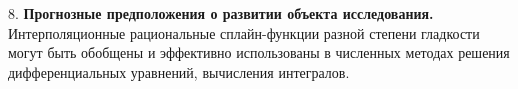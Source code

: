 8. \textbf{ Прогнозные предположения о развитии объекта исследования.} Интерполяционные рациональные
сплайн-функции разной степени гладкости могут быть обобщены и эффективно использованы в
 численных методах решения дифференциальных уравнений, вычисления интегралов.




%
%
%

